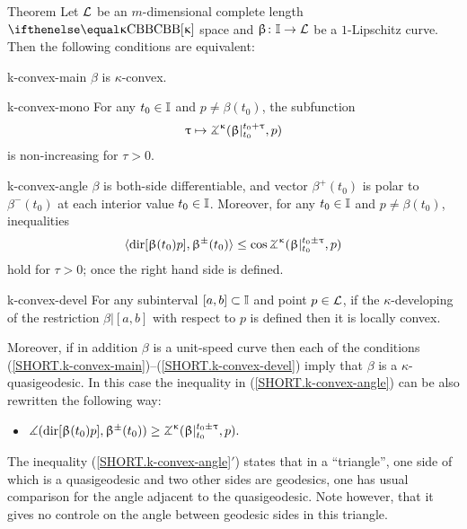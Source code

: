 \begin{thm}{Theorem}\label{thm:defs.of.k-convex.curve}
Let $\mathcal{L}$  be an $m$-dimensional complete length $\Alex{\kappa}$ space
and
$\beta\:\II\to \spc{L}$ be a $1$-Lipschitz curve.
Then the following conditions are equivalent:

\begin{subthm}{k-convex-main} $\beta$ is $\kappa$-convex. 
\end{subthm}


\begin{subthm}{k-convex-mono} For any $t_0\in\II$ and $p\not=\beta(t_0)$, 
the subfunction
\[\tau \mapsto\tangle\mc\kappa(\beta|_{t_0}^{t_0+\tau},p)\]
is non-increasing for $\tau>0$.
\end{subthm}

\begin{subthm}{k-convex-angle} $\beta$ is both-side differentiable, and vector $\beta^+(t_0)$ is polar to $\beta^-(t_0)$ at each interior value $t_0\in \II$.
Moreover, for any $t_0\in\II$ and $p\not=\beta(t_0)$, inequalities
\[\<\dir{\beta(t_0)}p,\beta^\pm(t_0)\>
\le 
\cos\tangle\mc\kappa(\beta|_{t_0}^{t_0\pm\tau}, p)\] 
hold for $\tau>0$; once the right hand side is defined.
\end{subthm}

\begin{subthm}{k-convex-devel} For any subinterval $[a,b]\subset\II$ and point $p\in \spc{L}$,
if the $\kappa$-developing of the restriction $\beta|[a,b]$
with respect to $p$ is defined then it is locally convex.
\end{subthm}

Moreover, if in addition $\beta$ is a unit-speed curve then each of the conditions  (\ref{SHORT.k-convex-main})--(\ref{SHORT.k-convex-devel}) imply that $\beta$ is a $\kappa$-quasigeodesic.
In this case the inequality in (\ref{SHORT.k-convex-angle}) can be also rewritten the following way:
\begin{itemize}
 \item[\textit{\ref{SHORT.k-convex-angle}$'$)}] $\mangle(\dir{\beta(t_0)}p,\beta^\pm(t_0))
\ge \tangle\mc\kappa(\beta|_{t_0}^{t_0\pm\tau}, p).$
\end{itemize}



\end{thm}

The inequality (\ref{SHORT.k-convex-angle}$'$) states that in a ``triangle'', one side of which is a quasigeodesic and two other sides are geodesics, one has usual comparison for the angle adjacent to the quasigeodesic.
Note however, that it gives no controle on the angle between geodesic sides in this triangle.

